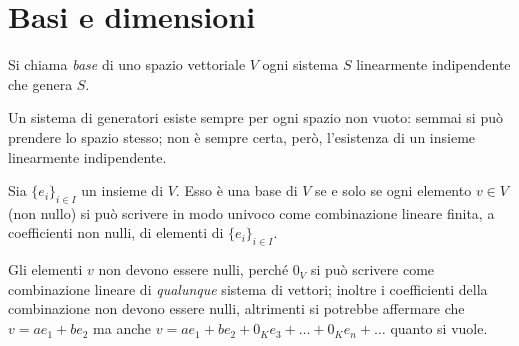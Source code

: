 \section{Basi e dimensioni} \label{sec:basi-dimensioni}
\begin{definizione} \label{d:base}
	Si chiama \emph{base} di uno spazio vettoriale $V$ ogni sistema $S$ linearmente indipendente che genera $S$.
\end{definizione}
	Un sistema di generatori esiste sempre per ogni spazio non vuoto: semmai si può prendere lo spazio stesso; non è sempre certa, però, l'esistenza di un insieme linearmente indipendente.
\begin{teorema}
	Sia $\{  e_i\}_{i\in I}$ un insieme di $V$.
	Esso è una base di $V$ se e solo se ogni elemento $  v\in V$ (non nullo) si può scrivere in modo univoco come combinazione lineare finita, a coefficienti non nulli, di elementi di $\{  e_i\}_{i\in I}$.
\end{teorema}
Gli elementi $  v$ non devono essere nulli, perché $0_V$ si può scrivere come combinazione lineare di \emph{qualunque} sistema di vettori; inoltre i coefficienti della combinazione non devono essere nulli, altrimenti si potrebbe affermare che $  v=a  e_1+b  e_2$ ma anche $  v=a  e_1+b  e_2+0_K  e_3+\dots+0_K  e_n+\dots$ quanto si vuole.
